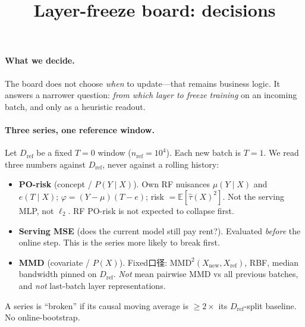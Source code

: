\documentclass[11pt]{article}
\title{Layer-freeze board: decisions}
\author{}
\date{}
\begin{document}
\maketitle
\thispagestyle{empty}

\paragraph{What we decide.}
The board does not choose \emph{when} to update---that remains business logic.
It answers a narrower question: \emph{from which layer to freeze training} on an incoming batch, and only as a heuristic readout.

\paragraph{Three series, one reference window.}
Let $D_{\mathrm{ref}}$ be a fixed $T{=}0$ window ($n_{\mathrm{ref}}{=}10^4$).
Each new batch is $T{=}1$.
We read three numbers against $D_{\mathrm{ref}}$, never against a rolling history:
\begin{itemize}\setlength{\itemsep}{2pt}
\item \textbf{PO-risk} (concept / $P(Y\mid X)$).
Own RF nuisances $\mu(Y\mid X)$ and $e(T\mid X)$; $\varphi=(Y-\mu)(T-e)$; risk $=\mathbb{E}[\hat\tau(X)^2]$.
Not the serving MLP, not $\ell_2$.
RF PO-risk is not expected to collapse first.
\item \textbf{Serving MSE} (does the current model still pay rent?).
Evaluated \emph{before} the online step.
This is the series more likely to break first.
\item \textbf{MMD} (covariate / $P(X)$).
Fixed口径: $\mathrm{MMD}^2(X_{\mathrm{new}},X_{\mathrm{ref}})$, RBF, median bandwidth pinned on $D_{\mathrm{ref}}$.
\emph{Not} mean pairwise MMD vs all previous batches, and \emph{not} last-batch layer representations.
\end{itemize}
A series is ``broken'' if its causal moving average is $\ge 2\times$ its $D_{\mathrm{ref}}$-split baseline.
No online-bootstrap.
\end{document}
